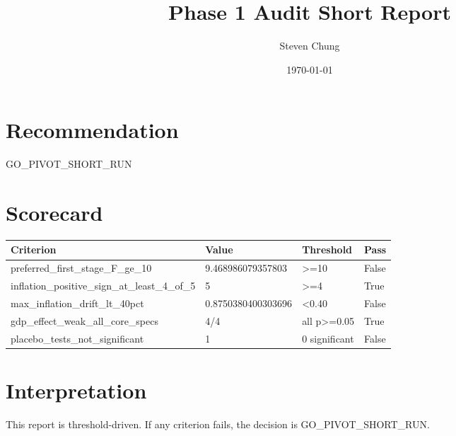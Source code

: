 \documentclass[11pt]{article}
\title{Phase 1 Audit Short Report}
\author{Steven Chung}
\date{\today}
\begin{document}
\maketitle
\section*{Recommendation}
GO\_PIVOT\_SHORT\_RUN
\section*{Scorecard}
\begin{tabular}{p{7.2cm}p{2.5cm}p{2.0cm}p{1.2cm}}
\toprule
Criterion & Value & Threshold & Pass \\
\midrule
preferred\_first\_stage\_F\_ge\_10 & 9.468986079357803 & >=10 & False \\
inflation\_positive\_sign\_at\_least\_4\_of\_5 & 5 & >=4 & True \\
max\_inflation\_drift\_lt\_40pct & 0.8750380400303696 & <0.40 & False \\
gdp\_effect\_weak\_all\_core\_specs & 4/4 & all p>=0.05 & True \\
placebo\_tests\_not\_significant & 1 & 0 significant & False \\
\bottomrule
\end{tabular}
\section*{Interpretation}
This report is threshold-driven. If any criterion fails, the decision is GO\_PIVOT\_SHORT\_RUN.
\end{document}
